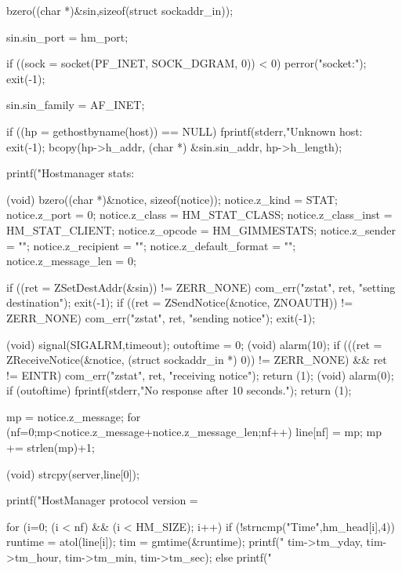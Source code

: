 \begin{code}
{        bzero((char *)&sin,sizeof(struct sockaddr_in));

        sin.sin_port = hm_port;

        if ((sock = socket(PF_INET, SOCK_DGRAM, 0)) < 0) {
                perror("socket:");
                exit(-1);
        }
        
        sin.sin_family = AF_INET;

        if ((hp = gethostbyname(host)) == NULL) {
                fprintf(stderr,"Unknown host: %
                exit(-1);
        }
        bcopy(hp->h_addr, (char *) &sin.sin_addr, hp->h_length);

        printf("Hostmanager stats: %
        
        (void) bzero((char *)&notice, sizeof(notice));
        notice.z_kind = STAT;
        notice.z_port = 0;
        notice.z_class = HM_STAT_CLASS;
        notice.z_class_inst = HM_STAT_CLIENT;
        notice.z_opcode = HM_GIMMESTATS;
        notice.z_sender = "";
        notice.z_recipient = "";
        notice.z_default_format = "";
        notice.z_message_len = 0;
        
        if ((ret = ZSetDestAddr(&sin)) != ZERR_NONE) {
                com_err("zstat", ret, "setting destination");
                exit(-1);
        }
        if ((ret = ZSendNotice(&notice, ZNOAUTH)) != ZERR_NONE) {
                com_err("zstat", ret, "sending notice");
                exit(-1);
        }

        (void) signal(SIGALRM,timeout);
        outoftime = 0;
        (void) alarm(10);
        if (((ret = ZReceiveNotice(&notice, (struct sockaddr_in *) 0))
             != ZERR_NONE) &&
            ret != EINTR) {
                com_err("zstat", ret, "receiving notice");
                return (1);
        }
        (void) alarm(0);
        if (outoftime) {
                fprintf(stderr,"No response after 10 seconds.\n");
                return (1);
        }
        
        mp = notice.z_message;
        for (nf=0;mp<notice.z_message+notice.z_message_len;nf++) {
                line[nf] = mp;
                mp += strlen(mp)+1;
        }

        (void) strcpy(server,line[0]);

        printf("HostManager protocol version = %

        for (i=0; (i < nf) && (i < HM_SIZE); i++) {
                if (!strncmp("Time",hm_head[i],4)) {
                        runtime = atol(line[i]);
                        tim = gmtime(&runtime);
                        printf("%
                                tim->tm_yday,
                                tim->tm_hour,
                                tim->tm_min,
                                tim->tm_sec);
                }
                else
                        printf("%
        }

}
\end{code}
